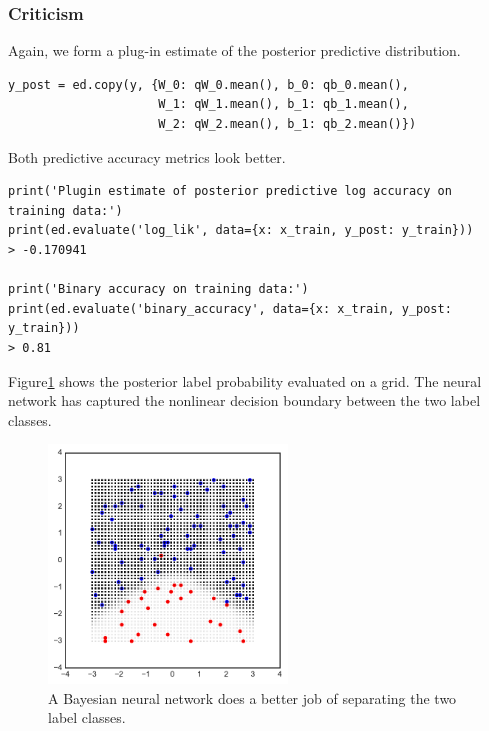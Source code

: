 \subsubsection{Criticism}

Again, we form a plug-in estimate of the posterior predictive distribution.
\begin{lstlisting}
y_post = ed.copy(y, {W_0: qW_0.mean(), b_0: qb_0.mean(),
                     W_1: qW_1.mean(), b_1: qb_1.mean(),
                     W_2: qW_2.mean(), b_1: qb_2.mean()})
\end{lstlisting}

Both predictive accuracy metrics look better.
\begin{lstlisting}
print('Plugin estimate of posterior predictive log accuracy on training data:')
print(ed.evaluate('log_lik', data={x: x_train, y_post: y_train}))
> -0.170941

print('Binary accuracy on training data:')
print(ed.evaluate('binary_accuracy', data={x: x_train, y_post: y_train}))
> 0.81
\end{lstlisting}

Figure\nobreakspace \ref{fig:lr_nn} shows the posterior label probability evaluated on a grid.
The neural network has captured the nonlinear decision boundary between the two
label classes.
\begin{figure}[!htb]
\centering
\includegraphics[width=2.5in]{images/lr_nn.pdf}
\caption{A Bayesian neural network does a better job of separating the two
label classes.}
\label{fig:lr_nn}
\end{figure}
